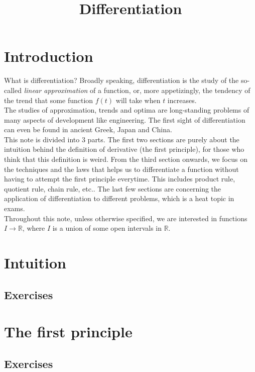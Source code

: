 \documentclass{fts_m2}
\title{Differentiation}
\begin{document}
    \maketitle\clearpage
    \section*{Introduction}
    What is differentiation? Broadly speaking, differentiation is the study of the so-called \textit{linear approximation} of a function, or, more appetizingly, the tendency of the trend that some function $f(t)$ will take when $t$ increases.\\
    The studies of approximation, trends and optima are long-standing problems of many aspects of development like engineering.
    The first sight of differentiation can even be found in ancient Greek, Japan and China.\\
    This note is divided into 3 parts.
    The first two sections are purely about the intuition behind the definition of derivative (the first principle), for those who think that this definition is weird.
    From the third section onwards, we focus on the techniques and the laws that helps us to differentiate a function without having to attempt the first principle everytime.
    This includes product rule, quotient rule, chain rule, etc..
    The last few sections are concerning the application of differentiation to different problems, which is a heat topic in exams.\\
    Throughout this note, unless otherwise specified, we are interested in functions $I\to\mathbb R$, where $I$ is a union of some open intervals in $\mathbb R$.

    \section{Intuition}
    
    \subsection*{Exercises}
      
    
    \section{The first principle}
    
    \subsection*{Exercises}
    
\end{document}
